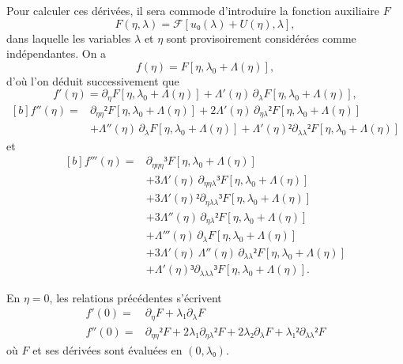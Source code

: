 \documentclass[12pt, final]{amsart}
\begin{document}
Pour calculer ces dérivées, il sera commode d'introduire la fonction auxiliaire
\(F\)
\begin{equation}
  F(η, \lambda)=\mathcal F[u₀(\lambda)+U(η), \lambda],
\end{equation}
dans laquelle les variables \(\lambda\) et \(η\) sont provisoirement
considérées comme indépendantes. On a
\begin{equation}
  f(η)=F[η, \lambda_0+\Lambda(η)],
\end{equation}
d'où l'on déduit successivement que
\begin{equation}
  \label{eq:20211112162417}
  f'(η)=\partial_η F[η, \lambda_0+\Lambda(η)]
  +\Lambda'(η)\,\partial_\lambda F[η, \lambda_0+\Lambda(η)],
\end{equation}
\begin{equation}
  \begin{aligned}[b]
    \label{eq:20211112165810}
    f''(η)={}&\partial_{ηη}²F[η, \lambda_0+\Lambda(η)]
    +2\Lambda'(η)\,\partial_{η\lambda}²F[η, \lambda_0+\Lambda(η)]\\
    &+\Lambda''(η)\,\partial_\lambda F[η, \lambda_0+\Lambda(η)]
    +\Lambda'(η)²\partial_{\lambda\lambda}²F[η, \lambda_0+\Lambda(η)]
  \end{aligned}
\end{equation}
et
\begin{equation}
  \label{eq:20211112173223}
  \begin{aligned}[b]
    f'''(η)={}&\partial_{ηηη}³F[η, \lambda_0+\Lambda(η)]\\
    &+3\Lambda'(η)\,\partial_{ηη\lambda}³F[η, \lambda_0+\Lambda(η)]\\
    &+3\Lambda'(η)²\partial_{η\lambda\lambda}³F[η, \lambda_0+\Lambda(η)]\\
    &+3\Lambda''(η)\,\partial_{η\lambda}²F[η, \lambda_0+\Lambda(η)]\\
    &+\Lambda'''(η)\,\partial_\lambda F[η, \lambda_0+\Lambda(η)]\\
    &+3\Lambda'(η)\,\Lambda''(η)\,\partial_{\lambda\lambda}²F[η, \lambda_0+\Lambda(η)]\\
    &+\Lambda'(η)³\partial_{\lambda\lambda\lambda}³F[η, \lambda_0+\Lambda(η)].
  \end{aligned}
\end{equation}

En \(η=0\), les relations précédentes s'écrivent
\begin{align}
  f'(0)={}&\partial_η F+\lambda₁\partial_\lambda F\\
  f''(0)={}&\partial_{ηη}²F+2\lambda₁\partial_{η\lambda}²F
             +2\lambda₂\partial_\lambda F+\lambda₁²\partial_{\lambda\lambda}²F
\end{align}
où \(F\) et ses dérivées sont évaluées en \((0, λ₀)\).
\end{document}
